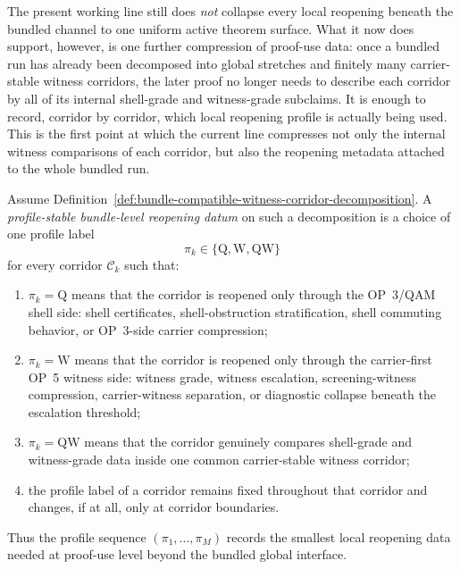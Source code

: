 \begin{remark}
\label{rem:status-of-the-first-bundle-level-reopening-compression-step}
The present working line still does \emph{not} collapse every local reopening beneath the bundled channel to one uniform active theorem surface. What it now does support, however, is one further compression of proof-use data: once a bundled run has already been decomposed into global stretches and finitely many carrier-stable witness corridors, the later proof no longer needs to describe each corridor by all of its internal shell-grade and witness-grade subclaims. It is enough to record, corridor by corridor, which local reopening profile is actually being used. This is the first point at which the current line compresses not only the internal witness comparisons of each corridor, but also the reopening metadata attached to the whole bundled run.
\end{remark}

\begin{definition}
\label{def:profile-stable-bundle-level-reopening-data}
Assume Definition~\ref{def:bundle-compatible-witness-corridor-decomposition}. A \emph{profile-stable bundle-level reopening datum} on such a decomposition is a choice of one profile label
\[
\pi_k\in\{\mathrm{Q},\mathrm{W},\mathrm{QW}\}
\]
for every corridor $\mathcal C_k$ such that:
\begin{enumerate}[leftmargin=2em,label=(\roman*)]
\item $\pi_k=\mathrm{Q}$ means that the corridor is reopened only through the OP~3/QAM shell side: shell certificates, shell-obstruction stratification, shell commuting behavior, or OP~3-side carrier compression;
\item $\pi_k=\mathrm{W}$ means that the corridor is reopened only through the carrier-first OP~5 witness side: witness grade, witness escalation, screening-witness compression, carrier-witness separation, or diagnostic collapse beneath the escalation threshold;
\item $\pi_k=\mathrm{QW}$ means that the corridor genuinely compares shell-grade and witness-grade data inside one common carrier-stable witness corridor;
\item the profile label of a corridor remains fixed throughout that corridor and changes, if at all, only at corridor boundaries.
\end{enumerate}
Thus the profile sequence $(\pi_1,\ldots,\pi_M)$ records the smallest local reopening data needed at proof-use level beyond the bundled global interface.
\end{definition}

